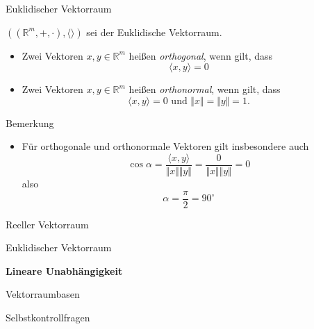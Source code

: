 \documentclass[
  8pt,
  ignorenonframetext,
]{beamer}
\providecommand{\tightlist}{%
  \setlength{\itemsep}{0pt}\setlength{\parskip}{0pt}}
\begin{document}
\begin{frame}{Euklidischer Vektorraum}
\protect\hypertarget{euklidischer-vektorraum-12}{}
\small
\begin{definition}
\justifying
$\left((\mathbb{R}^m, +, \cdot), \langle \rangle \right)$ sei der Euklidische Vektorraum.
\begin{itemize}
\item Zwei Vektoren $x,y \in \mathbb{R}^m$ heißen \textit{orthogonal}, wenn gilt, dass
\begin{equation}
\langle x, y \rangle = 0
\end{equation}
\item Zwei Vektoren $x,y \in \mathbb{R}^m$ heißen \textit{orthonormal}, wenn gilt, dass
\begin{equation}
\langle x, y \rangle = 0 \mbox{ und } \Vert x \Vert = \Vert y \Vert = 1.
\end{equation}
\end{itemize}
\end{definition}

Bemerkung

\begin{itemize}
\tightlist
\item
  Für orthogonale und orthonormale Vektoren gilt insbesondere auch
  \begin{equation}
  \cos \alpha
  = \frac{\langle x, y \rangle}{\Vert x \Vert \Vert y \Vert}
  = \frac{0}{\Vert x \Vert \Vert y \Vert}
  = 0
  \end{equation} also \begin{equation}
  \alpha = \frac{\pi}{2} = 90^{\circ}
  \end{equation}
\end{itemize}
\end{frame}

\begin{frame}{}
\protect\hypertarget{section-6}{}
\large
\vfill

Reeller Vektorraum

Euklidischer Vektorraum

\textbf{Lineare Unabhängigkeit}

Vektorraumbasen

Selbstkontrollfragen \vfill
\end{frame}
\end{document}
